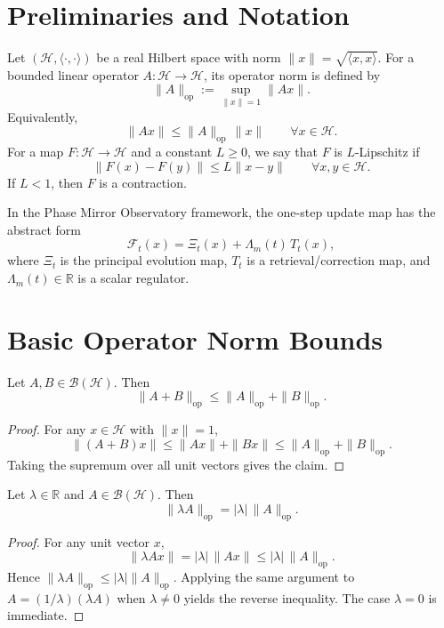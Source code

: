 \documentclass[11pt]{article}
\begin{document}
\section{Preliminaries and Notation}
Let $(\mathcal{H},\langle \cdot,\cdot\rangle)$ be a real Hilbert space with norm $\|x\|=\sqrt{\langle x,x\rangle}$. For a bounded linear operator $A:\mathcal{H}\to\mathcal{H}$, its operator norm is defined by
\[
\|A\|_{\mathrm{op}} := \sup_{\|x\|=1} \|Ax\|.
\]
Equivalently,
\[
\|Ax\| \le \|A\|_{\mathrm{op}}\,\|x\| \qquad \forall x\in\mathcal{H}.
\]
For a map $F:\mathcal{H}\to\mathcal{H}$ and a constant $L\ge 0$, we say that $F$ is $L$-Lipschitz if
\[
\|F(x)-F(y)\| \le L\|x-y\| \qquad \forall x,y\in\mathcal{H}.
\]
If $L<1$, then $F$ is a contraction.

In the Phase Mirror Observatory framework, the one-step update map has the abstract form
\[
\mathcal{F}_t(x) = \Xi_t(x) + \Lambda_m(t)\,T_t(x), \tag{A.1}
\]
where $\Xi_t$ is the principal evolution map, $T_t$ is a retrieval/correction map, and $\Lambda_m(t)\in\mathbb{R}$ is a scalar regulator.

\section{Basic Operator Norm Bounds}

\begin{lemma}
Let $A,B\in \mathcal{B}(\mathcal{H})$. Then
\[
\|A+B\|_{\mathrm{op}} \le \|A\|_{\mathrm{op}} + \|B\|_{\mathrm{op}}.
\]
\end{lemma}

\begin{proof}
For any $x\in\mathcal{H}$ with $\|x\|=1$,
\[
\|(A+B)x\| \le \|Ax\| + \|Bx\| \le \|A\|_{\mathrm{op}} + \|B\|_{\mathrm{op}}.
\]
Taking the supremum over all unit vectors gives the claim.
\end{proof}

\begin{lemma}
Let $\lambda\in\mathbb{R}$ and $A\in \mathcal{B}(\mathcal{H})$. Then
\[
\|\lambda A\|_{\mathrm{op}} = |\lambda|\,\|A\|_{\mathrm{op}}.
\]
\end{lemma}

\begin{proof}
For any unit vector $x$,
\[
\|\lambda A x\| = |\lambda|\,\|Ax\| \le |\lambda|\,\|A\|_{\mathrm{op}}.
\]
Hence $\|\lambda A\|_{\mathrm{op}}\le |\lambda|\|A\|_{\mathrm{op}}$. Applying the same argument to $A=(1/\lambda)(\lambda A)$ when $\lambda\neq 0$ yields the reverse inequality. The case $\lambda=0$ is immediate.
\end{proof}
\end{document}
